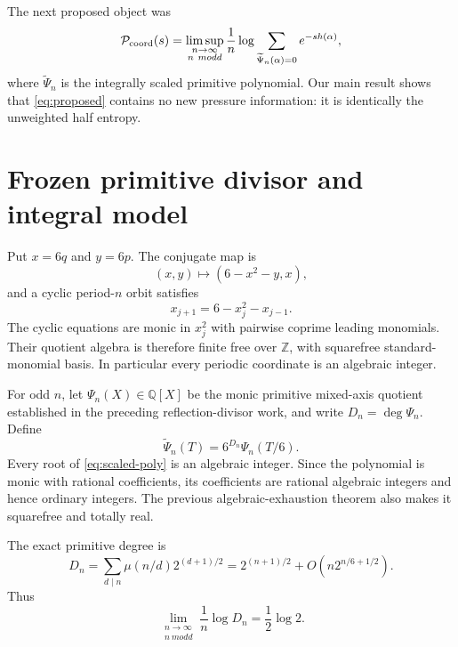 \documentclass[11pt]{article}
\theoremstyle{remark}
\newcommand{\htw}{h}
\begin{document}
The next proposed object was
\begin{equation}\label{eq:proposed}
\mathcal P_{\rm coord}(s)
=\limsup_{\substack{n\to\infty\\n\ {
m odd}}}
\frac1n\log\sum_{\widetilde\Psi_n(\alpha)=0}
e^{-s\htw(\alpha)},
\end{equation}
where $\widetilde\Psi_n$ is the integrally scaled primitive polynomial.
Our main result shows that \eqref{eq:proposed} contains no new pressure
information: it is identically the unweighted half entropy.

\section{Frozen primitive divisor and integral model}
Put $x=6q$ and $y=6p$.  The conjugate map is
\begin{equation}\label{eq:integral-map}
(x,y)\longmapsto(6-x^2-y,x),
\end{equation}
and a cyclic period-$n$ orbit satisfies
\begin{equation}\label{eq:recurrence}
x_{j+1}=6-x_j^2-x_{j-1}.
\end{equation}
The cyclic equations are monic in $x_j^2$ with pairwise coprime leading
monomials.  Their quotient algebra is therefore finite free over
$\mathbb Z$, with squarefree standard-monomial basis.  In particular every
periodic coordinate is an algebraic integer.

For odd $n$, let $\Psi_n(X)\in\mathbb Q[X]$ be the monic primitive
mixed-axis quotient established in the preceding reflection-divisor work,
and write $D_n=\deg\Psi_n$.  Define
\begin{equation}\label{eq:scaled-poly}
\widetilde\Psi_n(T)=6^{D_n}\Psi_n(T/6).
\end{equation}
Every root of \eqref{eq:scaled-poly} is an algebraic integer.  Since the
polynomial is monic with rational coefficients, its coefficients are
rational algebraic integers and hence ordinary integers.  The previous
algebraic-exhaustion theorem also makes it squarefree and totally real.

The exact primitive degree is
\begin{equation}\label{eq:degree}
D_n=\sum_{d\mid n}\mu(n/d)2^{(d+1)/2}
=2^{(n+1)/2}+O\!\left(n2^{n/6+1/2}\right).
\end{equation}
Thus
\begin{equation}\label{eq:degree-entropy}
\lim_{\substack{n\to\infty\\n\ {
m odd}}}\frac1n\log D_n
=\frac12\log2.
\end{equation}
\end{document}
